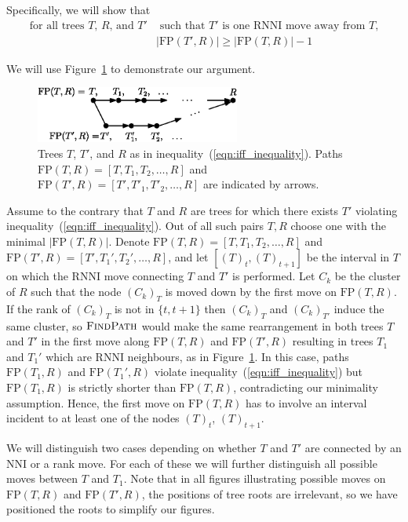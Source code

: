 \documentclass[11pt]{amsart}
\newcommand{\rnni}{\mathrm{RNNI}}
\newcommand{\findpath}{\textsc{FindPath}}
\newcommand{\nni}{\mathrm{NNI}}
\newcommand{\fp}{\mathrm{FP}}
\begin{document}
Specifically, we will show that
\begin{equation}
\begin{split}
\mbox{for all trees $T$, $R$, and $T'$}	& \mbox{ such that $T'$ is one $\rnni$ move away from $T$,}\\
					&|\fp(T',R)| \geq |\fp(T,R)| - 1
\end{split}
 \label{eqn:iff_inequality}
\end{equation}

We will use Figure~\ref{fig:proof_idea} to demonstrate our argument.

\begin{figure}[!hbt]
\centering
\includegraphics[width=0.6\textwidth]{proof_idea_ag}
\caption{Trees $T$, $T'$, and $R$ as in inequality~(\ref{eqn:iff_inequality}).
Paths $\fp(T,R) = [T,T_1,T_2, \ldots, R]$ and $\fp(T',R) = [T',T'_1,T'_2, \ldots, R]$ are indicated by arrows.}
\label{fig:proof_idea}
\end{figure}

Assume to the contrary that $T$ and $R$ are trees for which there exists $T'$ violating inequality~(\ref{eqn:iff_inequality}).
Out of all such pairs $T, R$ choose one with the minimal $|\fp(T, R)|$.
Denote $\fp(T,R) = [T, T_1, T_2, \ldots, R]$ and $\fp(T', R) = [T', T_1', T_2', \ldots, R]$, and let $[(T)_t, (T)_{t+1}]$ be the interval in $T$ on which the $\rnni$ move connecting $T$ and $T'$ is performed.
Let $C_k$ be the cluster of $R$ such that the node $(C_k)_T$ is moved down by the first move on $\fp(T, R)$.
If the rank of $(C_k)_T$ is not in $\{t, t+1\}$ then $(C_k)_T$ and $(C_k)_{T'}$ induce the same cluster, so $\findpath$ would make the same rearrangement in both trees $T$ and $T'$ in the first move along $\fp(T, R)$ and $\fp(T', R)$ resulting in trees $T_1$ and $T_1'$ which are $\rnni$ neighbours, as in Figure~\ref{fig:proof_idea}.
In this case, paths $\fp(T_1, R)$ and $\fp(T_1', R)$ violate inequality~(\ref{eqn:iff_inequality}) but $\fp(T_1, R)$ is strictly shorter than $\fp(T, R)$, contradicting our minimality assumption.
Hence, the first move on $\fp(T, R)$ has to involve an interval incident to at least one of the nodes $(T)_t$, $(T)_{t+1}$.

We will distinguish two cases depending on whether $T$ and $T'$ are connected by an $\nni$ or a rank move.
For each of these we will further distinguish all possible moves between $T$ and $T_1$.
Note that in all figures illustrating possible moves on $\fp(T,R)$ and $\fp(T',R)$, the positions of tree roots are irrelevant, so we have positioned the roots to simplify our figures.
\end{document}
